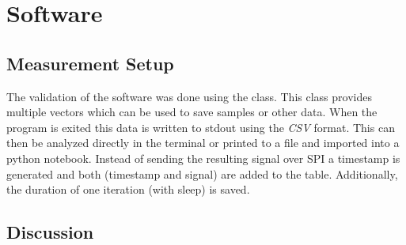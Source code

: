 \section{Software}

\subsection{Measurement Setup}

The validation of the software was done using the  class. This class provides multiple vectors which can be used to save samples or other data. When the program is exited this data is written to stdout using the \textit{CSV} format. This can then be analyzed directly in the terminal or printed to a file and imported into a python notebook.\p
%
Instead of sending the resulting signal over SPI a timestamp is generated and both (timestamp and signal) are added to the table. Additionally, the duration of one iteration (with sleep) is saved. %

\subsection{Discussion}

